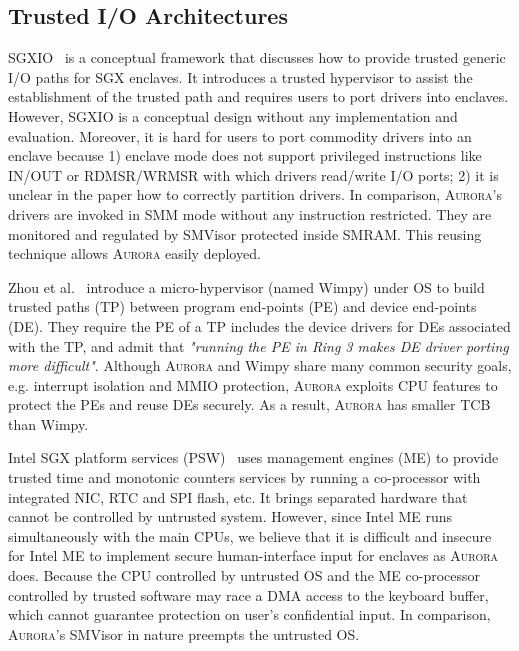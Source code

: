 \subsection{Trusted I/O Architectures}

SGXIO~\cite{weiser_sgxio:_2017} is a conceptual framework that discusses how to provide trusted generic I/O paths for SGX enclaves. It introduces a trusted hypervisor to assist the establishment of the trusted path and requires users to port drivers into enclaves. However, SGXIO is a conceptual design without any implementation and evaluation. Moreover, it is hard for users to port commodity drivers into an enclave because 1) enclave mode does not support privileged instructions like \textsf{IN/OUT} or \textsf{RDMSR/WRMSR} with which drivers read/write I/O ports; 2) it is unclear in the paper \cite{weiser_sgxio:_2017} how to correctly partition drivers. In comparison, \textsc{Aurora}'s drivers are invoked in SMM mode without any instruction restricted. They are monitored and regulated by SMVisor protected inside SMRAM. This reusing technique allows \textsc{Aurora} easily deployed.

Zhou et al.~\cite{zhou_dancing_2014} introduce a micro-hypervisor (named Wimpy) under OS to build trusted paths (TP) between program end-points (PE) and device end-points (DE). They require the PE of a TP includes the device drivers for DEs associated with the TP, and admit that \textit{"running the PE in Ring 3 makes DE driver porting more difficult"}.  Although \textsc{Aurora} and Wimpy share many common security goals, e.g. interrupt isolation and MMIO protection, \textsc{Aurora} exploits CPU features to protect the PEs and reuse DEs securely. As a result, \textsc{Aurora} has smaller TCB than Wimpy. 

Intel SGX platform services (PSW)~\cite{intel_psw} uses management engines (ME) to provide trusted time and monotonic counters services by running a co-processor with integrated NIC, RTC and SPI flash, etc. It brings separated hardware that cannot be controlled by untrusted system. However, since Intel ME runs simultaneously with the main CPUs, we believe that it is difficult and insecure for Intel ME to implement secure human-interface input for enclaves as \textsc{Aurora} does. Because the CPU controlled by untrusted OS and the ME co-processor controlled by trusted software may race a DMA access  to the keyboard buffer, which cannot guarantee protection on user's confidential input. In comparison, \textsc{Aurora}'s SMVisor in nature preempts the untrusted OS.

